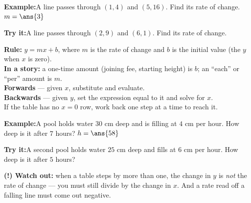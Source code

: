 \documentclass[12pt]{article}
\begin{document}
\begin{examplebox}
\textbf{Example:}\quad A line passes through $(1, 4)$ and $(5, 16)$. Find its
rate of change.
$m = \ans{3}$
\end{examplebox}

\begin{tryitbox}
\textbf{Try it:}\quad A line passes through $(2, 9)$ and $(6, 1)$. Find its
rate of change.\\[2pt]
\end{tryitbox}


\begin{formulabox}
\textbf{Rule:} \quad $y = mx + b$, \; where $m$ is the rate of change and $b$
is the initial value (the $y$ when $x$ is zero).\\[3pt]
\textbf{In a story:} a one-time amount (joining fee, starting height) is $b$;
an ``each'' or ``per'' amount is $m$.\\[3pt]
\textbf{Forwards} --- given $x$, substitute and evaluate.\\
\textbf{Backwards} --- given $y$, set the expression equal to it and solve
for $x$.\\[3pt]
If the table has no $x = 0$ row, work back one step at a time to reach it.
\end{formulabox}

\begin{examplebox}
\textbf{Example:}\quad A pool holds water $30$ cm deep and is filling at
$4$ cm per hour. How deep is it after $7$ hours?
$h = \ans{58}$
\end{examplebox}

\begin{tryitbox}
\textbf{Try it:}\quad A second pool holds water $25$ cm deep and fills at
$6$ cm per hour. How deep is it after $5$ hours?\\[2pt]
\end{tryitbox}

\begin{watchoutbox}
\textbf{(!) Watch out:} when a table steps by more than one, the change in $y$
is \emph{not} the rate of change --- you must still divide by the change in
$x$. And a rate read off a falling line must come out negative.
\end{watchoutbox}
\end{document}

